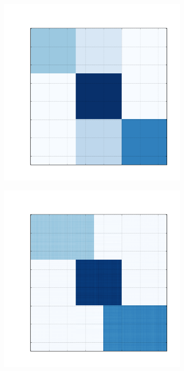 \documentclass[10pt]{beamer}
\begin{document}
\begin{frame}
\begin{figure}[H]
\begin{subfigure}[b]{0.13\textwidth}
      \end{subfigure}
      \begin{subfigure}[b]{0.13\textwidth}
          \includegraphics[width=\textwidth]{img/d-reconstruction-fnmtf.png}
      \end{subfigure}
      \begin{subfigure}[b]{0.13\textwidth}
          \includegraphics[width=\textwidth]{img/d-reconstruction-ovnmtf.png}

\end{subfigure}
\end{figure}
\end{frame}
\end{document}
